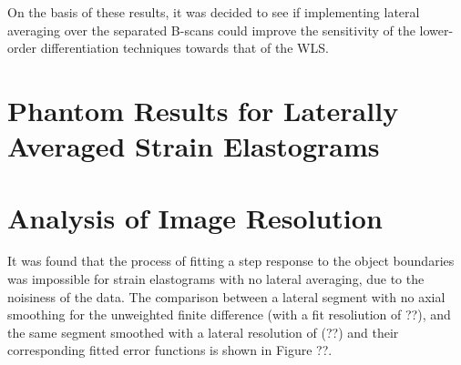 On the basis of these results, it was decided to see if implementing lateral averaging over the separated B-scans could improve the sensitivity of the lower-order differentiation techniques towards that of the WLS. 

\section{Phantom Results for Laterally Averaged Strain Elastograms}

\section{Analysis of Image Resolution}
It was found that the process of fitting a step response to the object boundaries was impossible for strain elastograms with no lateral averaging, due to the noisiness of the data. The comparison between a lateral segment with no axial smoothing for the unweighted finite difference (with a fit resoliution of ??), and the same segment smoothed with a lateral resolution of (??) and their corresponding fitted error functions is shown in Figure ??.
